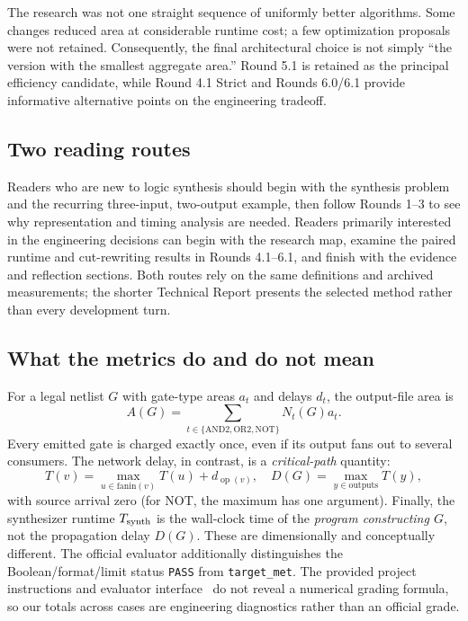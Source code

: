 \documentclass[a4paper,10pt]{article}
\theoremstyle{definition}
\theoremstyle{remark}
\newcounter{problem}
\begin{document}
The research was not one straight sequence of uniformly better algorithms. Some changes reduced area at considerable runtime cost; a few optimization proposals were not retained. Consequently, the final architectural choice is not simply ``the version with the smallest aggregate area.'' Round 5.1 is retained as the principal efficiency candidate, while Round 4.1 Strict and Rounds 6.0/6.1 provide informative alternative points on the engineering tradeoff.

\subsection{Two reading routes}
Readers who are new to logic synthesis should begin with the synthesis problem and the recurring three-input, two-output example, then follow Rounds 1--3 to see why representation and timing analysis are needed. Readers primarily interested in the engineering decisions can begin with the research map, examine the paired runtime and cut-rewriting results in Rounds 4.1--6.1, and finish with the evidence and reflection sections. Both routes rely on the same definitions and archived measurements; the shorter Technical Report presents the selected method rather than every development turn.

\subsection{What the metrics do and do not mean}
For a legal netlist $G$ with gate-type areas $a_t$ and delays $d_t$, the output-file area is
\begin{equation}\label{eq:logarea}
 A(G)=\sum_{t\in\{\mathrm{AND2},\mathrm{OR2},\mathrm{NOT}\}}N_t(G)a_t.
\end{equation}
Every emitted gate is charged exactly once, even if its output fans out to several consumers. The network delay, in contrast, is a \emph{critical-path} quantity:
\begin{equation}\label{eq:logdelay}
 T(v)=\max_{u\in\mathrm{fanin}(v)}T(u)+d_{\operatorname{op}(v)},\quad D(G)=\max_{y\in\mathrm{outputs}}T(y),
\end{equation}
with source arrival zero (for NOT, the maximum has one argument). Finally, the synthesizer runtime $T_{\rm synth}$ is the wall-clock time of the \emph{program constructing $G$}, not the propagation delay $D(G)$. These are dimensionally and conceptually different. The official evaluator additionally distinguishes the Boolean/format/limit status \texttt{PASS} from \texttt{target\_met}. The provided project instructions and evaluator interface~\cite{coursehandout} do not reveal a numerical grading formula, so our totals across cases are engineering diagnostics rather than an official grade.
\end{document}

